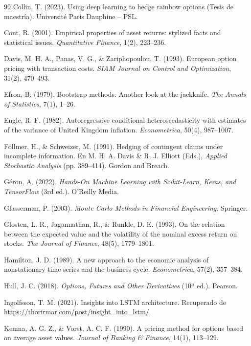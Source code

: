 \documentclass[11pt,a4paper,spanish]{article}
\numberwithin{equation}{section} %
\begin{document}
\begin{thebibliography}{99}
 Collin, T. (2023). Using deep learning to hedge rainbow options (Tesis de maestría). Université Paris Dauphine -- PSL.

 Cont, R. (2001). Empirical properties of asset returns: stylized facts and statistical issues. \textit{Quantitative Finance}, 1(2), 223--236.

 Davis, M. H. A., Panas, V. G., \& Zariphopoulou, T. (1993). European option pricing with transaction costs. \textit{SIAM Journal on Control and Optimization}, 31(2), 470--493.

 Efron, B. (1979). Bootstrap methods: Another look at the jackknife. \textit{The Annals of Statistics}, 7(1), 1--26.

 Engle, R. F. (1982). Autoregressive conditional heteroscedasticity with estimates of the variance of United Kingdom inflation. \textit{Econometrica}, 50(4), 987--1007.

 Föllmer, H., \& Schweizer, M. (1991). Hedging of contingent claims under incomplete information. En M. H. A. Davis \& R. J. Elliott (Eds.), \textit{Applied Stochastic Analysis} (pp. 389--414). Gordon and Breach.

 Géron, A. (2022). \textit{Hands-On Machine Learning with Scikit-Learn, Keras, and TensorFlow} (3rd ed.). O'Reilly Media.

 Glasserman, P. (2003). \textit{Monte Carlo Methods in Financial Engineering}. Springer.

 Glosten, L. R., Jagannathan, R., \& Runkle, D. E. (1993). On the relation between the expected value and the volatility of the nominal excess return on stocks. \textit{The Journal of Finance}, 48(5), 1779--1801.

 Hamilton, J. D. (1989). A new approach to the economic analysis of nonstationary time series and the business cycle. \textit{Econometrica}, 57(2), 357--384.

 Hull, J. C. (2018). \textit{Options, Futures and Other Derivatives} (10ª ed.). Pearson.

 Ingolfsson, T. M. (2021). Insights into LSTM architecture. Recuperado de \url{https://thorirmar.com/post/insight_into_lstm/}

 Kemna, A. G. Z., \& Vorst, A. C. F. (1990). A pricing method for options based on average asset values. \textit{Journal of Banking \& Finance}, 14(1), 113--129.


\end{thebibliography}
\end{document}
